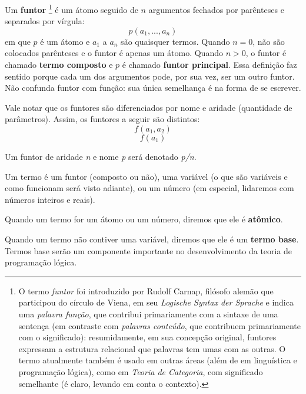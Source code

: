 \documentclass{article}
\begin{document}
  \theoremstyle{definition}
  \begin{definition} Um \textbf{funtor}
    \footnote{ O termo \textit{funtor} foi introduzido por Rudolf Carnap, filósofo alemão que participou do círculo de Viena, em seu \textit{Logische Syntax der Sprache}\cite{carnap} e indica uma \textit{palavra função}, que contribui primariamente com a sintaxe de uma sentença (em contraste com \textit{palavras conteúdo}, que contribuem primariamente com o significado): resumidamente, em sua concepção original, funtores expressam a estrutura relacional que palavras tem umas com as outras. O termo atualmente também é usado em outras áreas (além de em linguística e programação lógica), como em \textit{Teoria de Categoria}, com   significado semelhante (é claro, levando em conta o contexto).  }
    é um átomo seguido de $n$ argumentos fechados por parênteses e separados por vírgula:
    \[
      p(a_1, ..., a_n)
    \]
\noindent em que $p$ é um átomo e $a_1$ a $a_n$ são quaisquer termos. Quando $n = 0$, não são colocados parênteses e o funtor é apenas um átomo. Quando $n > 0$, o funtor é chamado \textbf{termo composto} e $p$ é chamado \textbf{funtor principal}. Essa definição faz sentido porque cada um dos argumentos pode, por sua vez, ser um outro funtor.
  Não confunda funtor com função: sua única semelhança é na forma de se escrever.
  \end{definition}
Vale notar que os funtores são diferenciados por nome e aridade (quantidade de parâmetros). Assim, os funtores a seguir são distintos:
    \[
      f(a_1, a_2)
    \]
    \[
      f(a_1)
    \]

    Um funtor de aridade \textit{n} e nome \textit{p} será denotado \textit{p/n}.



  \theoremstyle{definition}
  \begin{definition} Um termo é um funtor (composto ou não), uma variável (o que são variáveis e como funcionam será visto adiante), ou um número (em especial, lidaremos com números inteiros e reais).
  \end{definition}

  Quando um termo for um átomo ou um número, diremos que ele é \textbf{atômico}.

Quando um termo não contiver uma variável, diremos que ele é um \textbf{termo base}.
Termos base serão um componente importante no desenvolvimento da teoria de programação lógica.
\end{document}
